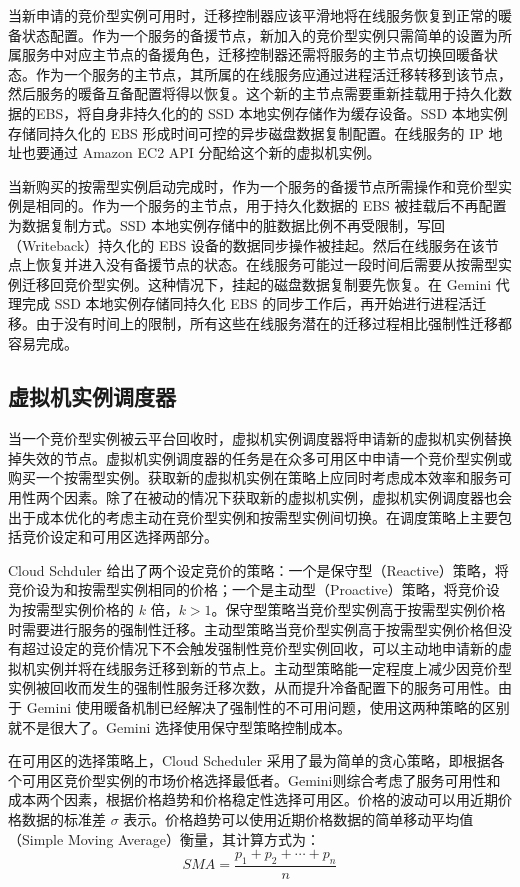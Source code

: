 当新申请的竞价型实例可用时，迁移控制器应该平滑地将在线服务恢复到正常的暖备状态配置。作为一个服务的备援节点，新加入的竞价型实例只需简单的设置为所属服务中对应主节点的备援角色，迁移控制器还需将服务的主节点切换回暖备状态。作为一个服务的主节点，其所属的在线服务应通过进程活迁移转移到该节点，然后服务的暖备互备配置将得以恢复。这个新的主节点需要重新挂载用于持久化数据的EBS，将自身非持久化的的 SSD 本地实例存储作为缓存设备。SSD 本地实例存储同持久化的 EBS 形成时间可控的异步磁盘数据复制配置。在线服务的 IP 地址也要通过 Amazon EC2 API 分配给这个新的虚拟机实例。

当新购买的按需型实例启动完成时，作为一个服务的备援节点所需操作和竞价型实例是相同的。作为一个服务的主节点，用于持久化数据的 EBS 被挂载后不再配置为数据复制方式。SSD 本地实例存储中的脏数据比例不再受限制，写回（Writeback）持久化的 EBS 设备的数据同步操作被挂起。然后在线服务在该节点上恢复并进入没有备援节点的状态。在线服务可能过一段时间后需要从按需型实例迁移回竞价型实例。这种情况下，挂起的磁盘数据复制要先恢复。在 Gemini 代理完成 SSD 本地实例存储同持久化 EBS 的同步工作后，再开始进行进程活迁移。由于没有时间上的限制，所有这些在线服务潜在的迁移过程相比强制性迁移都容易完成。

\subsection{虚拟机实例调度器}
当一个竞价型实例被云平台回收时，虚拟机实例调度器将申请新的虚拟机实例替换掉失效的节点。虚拟机实例调度器的任务是在众多可用区中申请一个竞价型实例或购买一个按需型实例。获取新的虚拟机实例在策略上应同时考虑成本效率和服务可用性两个因素。除了在被动的情况下获取新的虚拟机实例，虚拟机实例调度器也会出于成本优化的考虑主动在竞价型实例和按需型实例间切换。在调度策略上主要包括竞价设定和可用区选择两部分。

Cloud Schduler \cite{He:2015:CCH:2749246.2749275} 给出了两个设定竞价的策略：一个是保守型（Reactive）策略，将竞价设为和按需型实例相同的价格；一个是主动型（Proactive）策略，将竞价设为按需型实例价格的 $k$ 倍，$k > 1$。保守型策略当竞价型实例高于按需型实例价格时需要进行服务的强制性迁移。主动型策略当竞价型实例高于按需型实例价格但没有超过设定的竞价情况下不会触发强制性竞价型实例回收，可以主动地申请新的虚拟机实例并将在线服务迁移到新的节点上。主动型策略能一定程度上减少因竞价型实例被回收而发生的强制性服务迁移次数，从而提升冷备配置下的服务可用性。由于 Gemini 使用暖备机制已经解决了强制性的不可用问题，使用这两种策略的区别就不是很大了。Gemini 选择使用保守型策略控制成本。

在可用区的选择策略上，Cloud Scheduler 采用了最为简单的贪心策略，即根据各个可用区竞价型实例的市场价格选择最低者。Gemini则综合考虑了服务可用性和成本两个因素，根据价格趋势和价格稳定性选择可用区。价格的波动可以用近期价格数据的标准差 $\sigma$ 表示。价格趋势可以使用近期价格数据的简单移动平均值（Simple Moving Average）衡量，其计算方式为：
\begin{equation}
SMA = \frac{p_1 + p_2 + \cdots + p_n}{n}
\end{equation}

